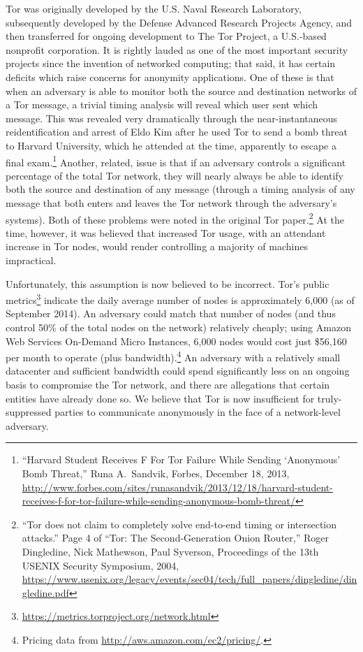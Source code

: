 \documentclass[12pt]{article}
\begin{document}
  Tor was originally developed by the U.S. Naval Research Laboratory, subsequently developed by the Defense Advanced Research Projects Agency, and then transferred for ongoing development to The Tor Project, a U.S.-based nonprofit corporation. It is rightly lauded as one of the most important security projects since the invention of networked computing; that said, it has certain deficits which raise concerns for anonymity applications. One of these is that when an adversary is able to monitor both the source and destination networks of a Tor message, a trivial timing analysis will reveal which user sent which message. This was revealed very dramatically through the near-instantaneous reidentification and arrest of Eldo Kim after he used Tor to send a bomb threat to Harvard University, which he attended at the time, apparently to escape a final exam.\footnote{``Harvard Student Receives F For Tor Failure While Sending `Anonymous' Bomb Threat,'' Runa A.\ Sandvik, Forbes, December 18, 2013, \url{http://www.forbes.com/sites/runasandvik/2013/12/18/harvard-student-receives-f-for-tor-failure-while-sending-anonymous-bomb-threat/}} Another, related, issue is that if an adversary controls a significant percentage of the total Tor network, they will nearly always be able to identify both the source and destination of any message (through a timing analysis of any message that both enters and leaves the Tor network through the adversary's systems). Both of these problems were noted in the original Tor paper.\footnote{``Tor does not claim to completely solve end-to-end timing or intersection attacks.'' Page 4 of ``Tor: The Second-Generation Onion Router,'' Roger Dingledine, Nick Mathewson, Paul Syverson, Proceedings of the 13th USENIX Security Symposium, 2004, \url{https://www.usenix.org/legacy/events/sec04/tech/full_papers/dingledine/dingledine.pdf}} At the time, however, it was believed that increased Tor usage, with an attendant increase in Tor nodes, would render controlling a majority of machines impractical.
  
  Unfortunately, this assumption is now believed to be incorrect. Tor's public metrics\footnote{\url{https://metrics.torproject.org/network.html}} indicate the daily average number of nodes is approximately 6,000 (as of September 2014). An adversary could match that number of nodes (and thus control 50\% of the total nodes on the network) relatively cheaply; using Amazon Web Services On-Demand Micro Instances, 6,000 nodes would cost just \$56,160 per month to operate (plus bandwidth).\footnote{Pricing data from \url{http://aws.amazon.com/ec2/pricing/}.} An adversary with a relatively small datacenter and sufficient bandwidth could spend significantly less on an ongoing basis to compromise the Tor network, and there are allegations that certain entities have already done so. We believe that Tor is now insufficient for truly-suppressed parties to communicate anonymously in the face of a network-level adversary.
  
\end{document}
